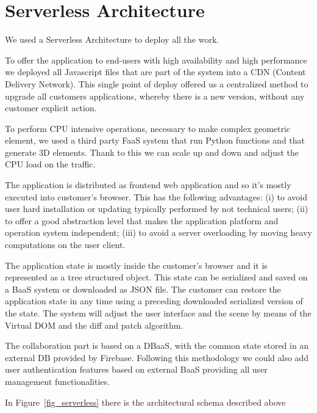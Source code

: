 \section{Serverless Architecture}\label{sec:architecture}

We used a Serverless Architecture to deploy all the work.

To offer the application to end-users with high availability and high performance we deployed all Javascript files that are part of the system into a CDN (Content Delivery Network). This single point of deploy offered us a centralized method to upgrade all customers applications, whereby there is a new version, without any customer explicit action.

To perform CPU intensive operations, necessary to make complex geometric element, we used a third party FaaS system that run Python functions and that generate 3D elements. Thank to this we can scale up and down and adjust the CPU load on the traffic.

The application is distributed as frontend web application and so it's mostly executed into customer's browser. This has the following advantages: (i) to avoid user hard installation or updating typically performed by not technical users; (ii) to offer a good abstraction level that makes the application platform and operation system independent;  (iii) to avoid a server overloading by moving heavy computations on the user client.

The application state is mostly inside the customer's browser and it is represented as a tree structured object. This state can be serialized and saved on a BaaS system or downloaded as JSON file. The customer can restore the application state in any time using a preceding downloaded serialized version of the state. The system will adjust the user interface and the scene by means of the Virtual DOM and the diff and patch algorithm.

The collaboration part is based on a DBaaS, with the common state stored in an external DB provided by Firebase. Following this methodology we could also add user authentication features based on external BaaS providing all user management functionalities.

In Figure~\ref{fig_serverless} there is the architectural schema described above\\\\

